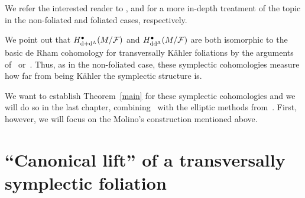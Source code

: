 \documentclass[10pt,a4paper]{amsart}
\numberwithin{equation}{section}
\begin{document}
We refer the interested reader to \cite{tseng,yan}, and \cite{baczekija,pawelija} for a more in-depth treatment of the topic in the non-foliated and foliated cases, respectively.

We point out that $H^{\bullet}_{{\rm d}+{\rm d}^{\Lambda}}(M\slash\mathcal{F})$ and $H^{\bullet}_{{\rm d}{\rm d}^{\Lambda}}(M\slash\mathcal{F})$ are both isomorphic to the basic de Rham cohomology for transversally K\"ahler foliations by the arguments of~\cite{pawel} or~\cite{baczekija}. Thus, as in the non-foliated case, these symplectic cohomologies measure how far from being K\"ahler the symplectic structure is.

We want to establish Theorem~\ref{main} for these symplectic cohomologies and we will do so in the last chapter, combining~\cite{tseng} with the elliptic methods from~\cite{azizeliptyczny}. First, however, we will focus on the Molino's construction mentioned above.

\section{``Canonical lift'' of a transversally symplectic foliation} \label{bundle}
\end{document}
